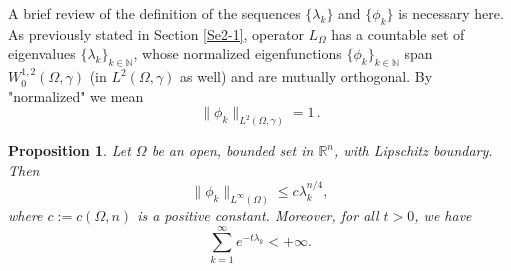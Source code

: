\documentclass[12pt]{amsart}
\newtheorem{proposition}[theorem]{Proposition}
\newcommand{\R}{\mathbb R}
\newcommand{\N}{\mathbb N}
\newcommand{\1}{\mathbf 1}
\begin{document}
A brief review of the definition of the sequences $\{ \lambda_k \}$ and $\{ \phi_k \}$ is necessary here. As previously stated in Section \ref{Se2-1}, operator $L_\Omega$ has a countable set of eigenvalues $\{\lambda_k\}_{k\in\N}$, whose normalized eigenfunctions $\{ \phi_k\}_{k\in\N}$ span $W^{1,2}_0(\Omega,\gamma)$ (in $L^2(\Omega,\gamma)$ as well) and are mutually orthogonal. By "normalized" we mean
$$
\|\phi_k\|_{L^2(\Omega,\gamma)}=1\,.
$$

\begin{proposition}\label{p2}
Let $\Omega$ be an open, bounded set in $\R^n$, with Lipschitz boundary. Then
\[
\|\phi_k\|_{L^{\infty}(\Omega)}\leq c\lambda_k^{n/4},
\]
where $c:=c(\Omega,n)$ is a positive constant. Moreover, for all $t>0$, we have
\[
\mathop{\sum}^{\infty}_{k=1} e^{-t\lambda_k }< +\infty.
\]
\end{proposition}
\end{document}
